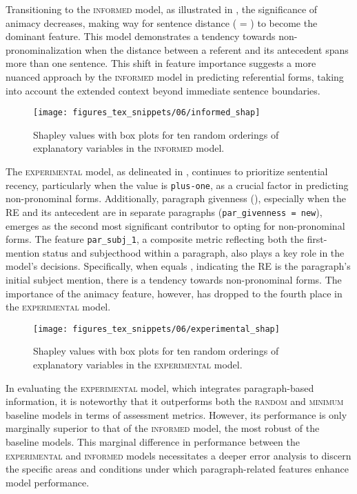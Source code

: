 Transitioning to the \textsc{informed} model, as illustrated in , the significance of animacy decreases, making way for sentence distance ( = ) to become the dominant feature. This model demonstrates a tendency towards non-pronominalization when the distance between a referent and its antecedent spans more than one sentence. This shift in feature importance suggests a more nuanced approach by the \textsc{informed} model in predicting referential forms, taking into account the extended context beyond immediate sentence boundaries.

\begin{figure}
	\centering
	\texttt{[image: figures\_tex\_snippets/06/informed\_shap]}
	\caption[Shapley values of the \textsc{informed} model.]{Shapley values with box plots for ten random orderings of explanatory variables in the \textsc{informed} model.}
	\label{fig:informedshap}
\end{figure}

\newpage
The \textsc{experimental} model, as delineated in , continues to prioritize sentential recency, particularly when the value is \texttt{plus-one}, as a crucial factor in predicting non-pronominal forms. Additionally, paragraph givenness (), especially when the RE and its antecedent are in separate paragraphs (\texttt{par\_givenness = new}), emerges as the second most significant contributor to opting for non-pronominal forms. The feature \texttt{par\_subj\_1}, a composite metric reflecting both the first-mention status and subjecthood within a paragraph, also plays a key role in the model's decisions. Specifically, when  equals , indicating the RE is the paragraph's initial subject mention, there is a tendency towards non-pronominal forms. The importance of the animacy feature, however, has dropped to the fourth place in the \textsc{experimental} model.

\begin{figure}
	\centering
	\texttt{[image: figures\_tex\_snippets/06/experimental\_shap]}
	\caption[Shapley values of the \textsc{experimental} model.]{Shapley values with box plots for ten random orderings of explanatory variables in the \textsc{experimental} model.}
	\label{fig:experimentalshap}
\end{figure}


In evaluating the \textsc{experimental} model, which integrates paragraph-based information, it is noteworthy that it outperforms both the \textsc{random} and \textsc{minimum} baseline models in terms of assessment metrics. However, its performance is only marginally superior to that of the \textsc{informed} model, the most robust of the baseline models. This marginal difference in performance between the \textsc{experimental} and \textsc{informed} models necessitates a deeper error analysis to discern the specific areas and conditions under which paragraph-related features enhance model performance.

